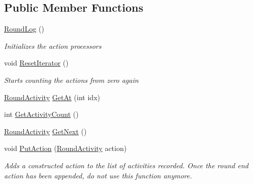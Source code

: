 \subsection*{Public Member Functions}
\begin{DoxyCompactItemize}
\item 
\hypertarget{class_m_b_c_1_1_core_1_1_round_log_a50d3d5c41078aa520500ca86dd5694ab}{\hyperlink{class_m_b_c_1_1_core_1_1_round_log_a50d3d5c41078aa520500ca86dd5694ab}{Round\-Log} ()}\label{class_m_b_c_1_1_core_1_1_round_log_a50d3d5c41078aa520500ca86dd5694ab}

\begin{DoxyCompactList}\small\item\em Initializes the action processors\end{DoxyCompactList}\item 
\hypertarget{class_m_b_c_1_1_core_1_1_round_log_ad5114bea3e605c3587033cc4b9db6aa7}{void \hyperlink{class_m_b_c_1_1_core_1_1_round_log_ad5114bea3e605c3587033cc4b9db6aa7}{Reset\-Iterator} ()}\label{class_m_b_c_1_1_core_1_1_round_log_ad5114bea3e605c3587033cc4b9db6aa7}

\begin{DoxyCompactList}\small\item\em Starts counting the actions from zero again\end{DoxyCompactList}\item 
\hyperlink{class_m_b_c_1_1_core_1_1_round_log_1_1_round_activity}{Round\-Activity} \hyperlink{class_m_b_c_1_1_core_1_1_round_log_a14deb5b327e8c77d3535e342701711d9}{Get\-At} (int idx)
\item 
int \hyperlink{class_m_b_c_1_1_core_1_1_round_log_a389bd537cf73c73998e0a789961d7536}{Get\-Activity\-Count} ()
\item 
\hyperlink{class_m_b_c_1_1_core_1_1_round_log_1_1_round_activity}{Round\-Activity} \hyperlink{class_m_b_c_1_1_core_1_1_round_log_a02c4c7d407ff609478505d28ff20f884}{Get\-Next} ()
\item 
\hypertarget{class_m_b_c_1_1_core_1_1_round_log_a0bb405409acf2b889d714bbff68abc94}{void \hyperlink{class_m_b_c_1_1_core_1_1_round_log_a0bb405409acf2b889d714bbff68abc94}{Put\-Action} (\hyperlink{class_m_b_c_1_1_core_1_1_round_log_1_1_round_activity}{Round\-Activity} action)}\label{class_m_b_c_1_1_core_1_1_round_log_a0bb405409acf2b889d714bbff68abc94}

\begin{DoxyCompactList}\small\item\em Adds a constructed action to the list of activities recorded. Once the round end action has been appended, do not use this function anymore.\end{DoxyCompactList}\end{DoxyCompactItemize}
